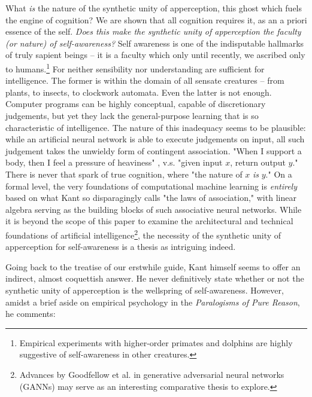 
What \emph{is} the nature of the synthetic unity of apperception, this ghost which fuels the engine of cognition? We are shown that all cognition requires it, as an a priori essence of the self. \emph{Does this make the synthetic unity of apperception the faculty (or nature) of self-awareness?} Self awareness is one of the indisputable hallmarks of truly sapient beings -- it is a faculty which only until recently, we ascribed only to humans.\footnote{Empirical experiments with higher-order primates and dolphins are highly suggestive of self-awareness in other creatures.} For neither sensibility nor understanding are sufficient for intelligence. The former is within the domain of all sensate creatures -- from plants, to insects, to clockwork automata. Even the latter is not enough. Computer programs can be highly conceptual, capable of discretionary judgements, but yet they lack the general-purpose learning that is so characteristic of intelligence. The nature of this inadequacy seems to be plausible: while an artificial neural network is able to execute judgements on input, all such judgement takes the unwieldy form of contingent association. "When I support a body, then I feel a pressure of heaviness" \autocite[B143]{hackett}, v.s. "given input $x$, return output $y$." There is never that spark of true cognition, where "the nature of $x$ \emph{is} $y$." On a formal level, the very foundations of computational machine learning is \emph{entirely} based on what Kant so disparagingly calls "the laws of association," with linear algebra serving as the building blocks of such associative neural networks. While it is beyond the scope of this paper to examine the architectural and technical foundations of artificial intelligence\footnote{Advances by Goodfellow et al. in generative adversarial neural networks (GANNs) may serve as an interesting comparative thesis to explore.}, the necessity of the synthetic unity of apperception for self-awareness is a thesis as intriguing indeed.

\noindent
Going back to the treatise of our erstwhile guide, Kant himself seems to offer an indirect, almost coquettish answer. He never definitively state whether or not the synthetic unity of apperception is the wellspring of self-awareness. However, amidst a brief aside on empirical psychology in the \emph{Paralogisms of Pure Reason}, he comments:

